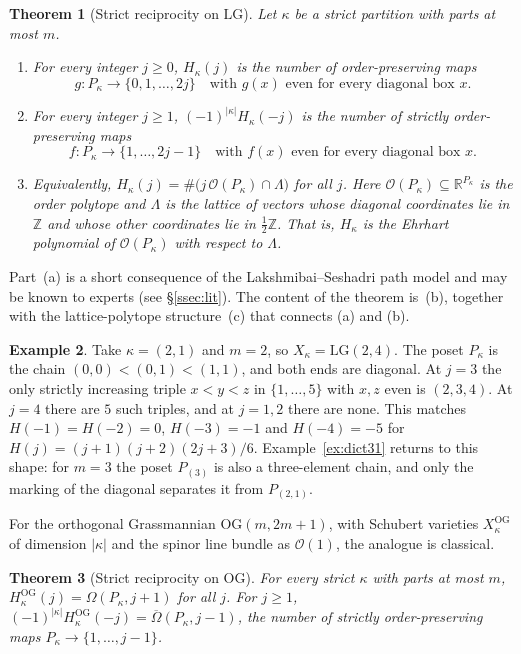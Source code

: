 \documentclass[11pt]{amsart}
\newtheorem{theorem}{Theorem}[section]
\theoremstyle{definition}
\newtheorem{example}[theorem]{Example}
\theoremstyle{remark}
\newcommand{\LG}{\mathrm{LG}}
\newcommand{\OG}{\mathrm{OG}}
\newcommand{\cO}{\mathcal{O}}
\newcommand{\Z}{\mathbb{Z}}
\newcommand{\R}{\mathbb{R}}
\newcommand{\Om}{\Omega}
\newcommand{\Omb}{\overline{\Omega}}
\newcommand{\HOG}{H^{\OG}}
\newcommand{\ord}{\mathcal{O}}
\begin{document}
\begin{theorem}[Strict reciprocity on $\LG$]\label{thm:main}
Let $\kappa$ be a strict partition with parts at most $m$.
\begin{enumerate}[label=(\alph*)]
\item For every integer $j\ge 0$, $H_\kappa(j)$ is the number of order-preserving maps
\[ g\colon P_\kappa\to\{0,1,\dots,2j\}\quad\text{with } g(x) \text{ even for every diagonal box } x. \]
\item For every integer $j\ge 1$, $(-1)^{|\kappa|}H_\kappa(-j)$ is the number of strictly
order-preserving maps
\[ f\colon P_\kappa\to\{1,\dots,2j-1\}\quad\text{with } f(x) \text{ even for every diagonal box } x. \]
\item Equivalently, $H_\kappa(j)=\#\bigl(j\,\ord(P_\kappa)\cap\Lambda\bigr)$ for all $j$.
Here $\ord(P_\kappa)\subseteq\R^{P_\kappa}$ is the order polytope and $\Lambda$ is the
lattice of vectors whose diagonal coordinates lie in $\Z$ and whose other coordinates lie
in $\tfrac12\Z$. That is, $H_\kappa$ is the Ehrhart polynomial of $\ord(P_\kappa)$ with
respect to $\Lambda$.
\end{enumerate}
\end{theorem}

Part~(a) is a short consequence of the Lakshmibai--Seshadri path model and may be known to
experts (see \S\ref{ssec:lit}). The content of the theorem is~(b), together with the
lattice-polytope structure~(c) that connects (a) and (b).

\begin{example}\label{ex:intro21}
Take $\kappa=(2,1)$ and $m=2$, so $X_\kappa=\LG(2,4)$. The poset $P_\kappa$ is the chain
$(0,0)<(0,1)<(1,1)$, and both ends are diagonal. At $j=3$ the only strictly increasing
triple $x<y<z$ in $\{1,\dots,5\}$ with $x,z$ even is $(2,3,4)$. At $j=4$ there are $5$
such triples, and at $j=1,2$ there are none. This matches
$H(-1)=H(-2)=0$, $H(-3)=-1$ and $H(-4)=-5$ for $H(j)=(j+1)(j+2)(2j+3)/6$.
Example~\ref{ex:dict31} returns to this shape: for $m=3$ the poset $P_{(3)}$ is also a
three-element chain, and only the marking of the diagonal separates it from $P_{(2,1)}$.
\end{example}

For the orthogonal Grassmannian $\OG(m,2m+1)$, with Schubert varieties $X^{\OG}_\kappa$ of
dimension $|\kappa|$ and the spinor line bundle as $\cO(1)$, the analogue is classical.

\begin{theorem}[Strict reciprocity on $\OG$]\label{thm:og}
For every strict $\kappa$ with parts at most $m$, $\HOG_\kappa(j)=\Om(P_\kappa,j+1)$ for
all $j$. For $j\ge1$, $(-1)^{|\kappa|}\HOG_\kappa(-j)=\Omb(P_\kappa,j-1)$, the number of
strictly order-preserving maps $P_\kappa\to\{1,\dots,j-1\}$.
\end{theorem}
\end{document}
